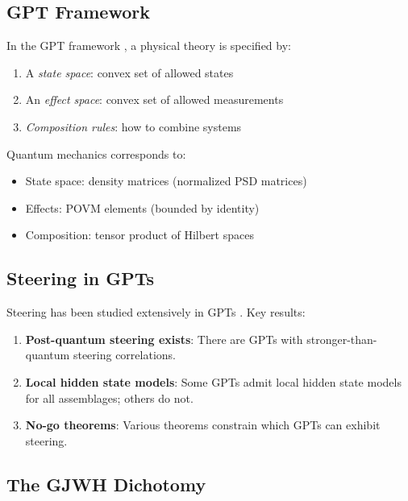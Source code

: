 \documentclass[11pt,a4paper]{article}
\theoremstyle{definition}
\begin{document}
\subsection{GPT Framework}

In the GPT framework \cite{hardy2001quantum,barrett2007information}, a physical theory is specified by:

\begin{enumerate}
    \item A \emph{state space}: convex set of allowed states
    \item An \emph{effect space}: convex set of allowed measurements
    \item \emph{Composition rules}: how to combine systems
\end{enumerate}

Quantum mechanics corresponds to:
\begin{itemize}
    \item State space: density matrices (normalized PSD matrices)
    \item Effects: POVM elements (bounded by identity)
    \item Composition: tensor product of Hilbert spaces
\end{itemize}

\subsection{Steering in GPTs}

Steering has been studied extensively in GPTs \cite{sainz2015postquantum}. Key results:

\begin{enumerate}
    \item \textbf{Post-quantum steering exists}: There are GPTs with stronger-than-quantum steering correlations.

    \item \textbf{Local hidden state models}: Some GPTs admit local hidden state models for all assemblages; others do not.

    \item \textbf{No-go theorems}: Various theorems constrain which GPTs can exhibit steering.
\end{enumerate}

\subsection{The GJWH Dichotomy}
\end{document}
